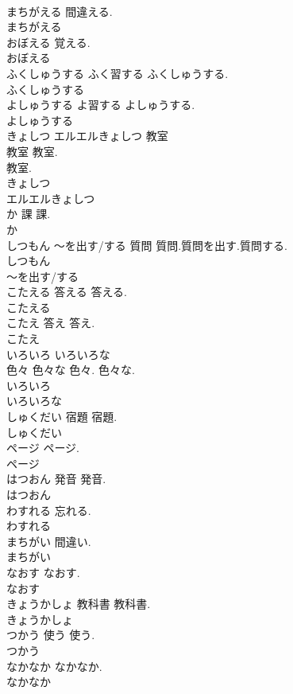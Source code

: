\documentclass[8pt]{extreport}
\begin{document}
\begin{CJK}{UTF8}{min}
\\	まちがえる		間違える.	
\\	まちがえる
\\	おぼえる		覚える.	
\\	おぼえる
\\	ふくしゅうする	ふく習する	ふくしゅうする.	
\\	ふくしゅうする
\\	よしゅうする	よ習する	よしゅうする.	
\\	よしゅうする
\\	きょしつ エルエルきょしつ	教室 
\\	教室	教室. 
\\	教室.	
\\	きょしつ
\\	エルエルきょしつ
\\	か	課	課.	
\\	か
\\	しつもん ～を出す/する	質問	質問.質問を出す.質問する.	
\\	しつもん
\\	～を出す/する
\\	こたえる	答える	答える.	
\\	こたえる
\\	こたえ	答え	答え.	
\\	こたえ
\\	いろいろ いろいろな	
\\	色々 色々な	色々. 色々な.	
\\	いろいろ
\\	いろいろな
\\	しゅくだい	宿題	宿題.	
\\	しゅくだい
\\	ページ		ページ.	
\\	ページ
\\	はつおん	発音	発音.	
\\	はつおん
\\	わすれる		忘れる.	
\\	わすれる
\\	まちがい		間違い.	
\\	まちがい
\\	なおす		なおす.	
\\	なおす
\\	きょうかしょ	教科書	教科書.	
\\	きょうかしょ
\\	つかう	使う	使う.	
\\	つかう
\\	なかなか		なかなか.	
\\	なかなか

\end{CJK}
\end{document}
